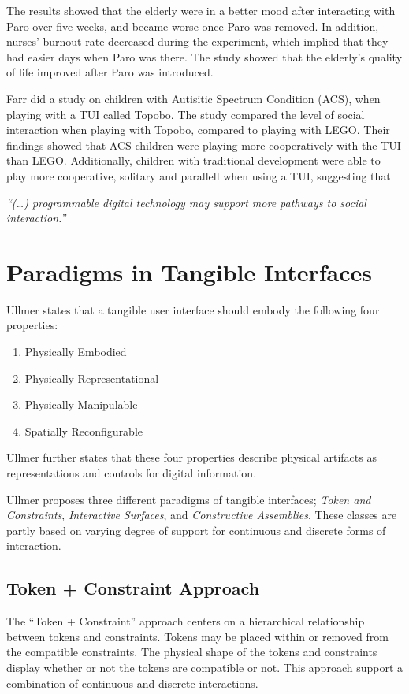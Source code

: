 The results showed that the elderly were in a better mood after interacting with Paro over five weeks, and became worse once Paro was removed. In addition, nurses' burnout rate decreased during the experiment, which implied that they had easier days when Paro was there. The study showed that the elderly's quality of life improved after Paro was introduced.           

Farr \etal{} did a study on children with Autisitic Spectrum Condition (ACS), when playing with a TUI called Topobo\cite{farr2010social}. The study compared the level of social interaction when playing with Topobo, compared to playing with LEGO. Their findings showed that ACS children were playing more cooperatively with the TUI than LEGO. Additionally, children with traditional development were able to play more cooperative, solitary and parallell when using a TUI, suggesting that 

\textit{``(\ldots) programmable digital technology may support more pathways to social interaction.''}

\section{Paradigms in Tangible Interfaces}
Ullmer states that a tangible user interface should embody the following four properties\cite{ullmer2002tangible}:

\begin{enumerate}
	\item{Physically Embodied}
	\item{Physically Representational}
	\item{Physically Manipulable}
	\item{Spatially Reconfigurable}
\end{enumerate}

Ullmer further states that these four properties describe physical artifacts as representations and controls for digital information. 

Ullmer proposes three different paradigms of tangible interfaces; \emph{Token and Constraints}, \emph{Interactive Surfaces}, and \emph{Constructive Assemblies}. These classes are partly based on varying degree of support for continuous and discrete forms of interaction\cite{ullmer2002tangible}.

\subsection{Token + Constraint Approach}
\label{sec:tokenandconstraint}
The ``Token + Constraint'' approach centers on a hierarchical relationship between tokens and constraints. Tokens may be placed within or removed from the compatible constraints. The physical shape of the tokens and constraints display whether or not the tokens are compatible or not. This approach support a combination of continuous and discrete interactions.

